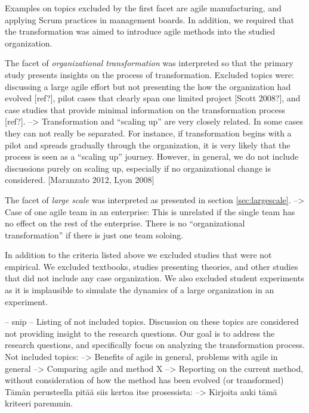 \documentclass[preprint,authoryear,12pt]{elsarticle}
\begin{document}
Examples on topics excluded by the first facet are agile manufacturing, and
applying Scrum practices in management boards. In addition, we required that the
transformation was aimed to introduce agile methods into the studied
organization.

The facet of \emph{organizational transformation} was interpreted so that the
primary study presents insights on the process of transformation. Excluded
topics were: discussing a large agile effort but not presenting the how the
organization had evolved [ref?], pilot cases that clearly span one limited
project [Scott 2008?], and case studies that provide minimal information on the
transformation process [ref?].
--> Transformation and ``scaling up'' are very closely related. In some cases
    they can not really be separated. For instance, if transformation begins
    with a pilot and spreads gradually through the organization, it is very
    likely that the process is seen as a ``scaling up'' journey.
    However, in general, we do not include discussions purely on scaling up,
    especially if no organizational change is considered. [Maranzato 2012, Lyon 2008]

The facet of \emph{large scale} was interpreted as presented in section
\ref{sec:largescale}.
--> Case of one agile team in an enterprise: This is unrelated if the single
    team has no effect on the rest of the enterprise. There is no
    ``organizational transformation'' if there is just one team soloing.  

In addition to the criteria listed above we excluded studies that were not
empirical. We excluded textbooks, studies presenting theories, and other studies
that did not include any case organization. We also excluded student experiments
as it is implausible to simulate the dynamics of a large organization in an
experiment.


% 

-- snip --
Listing of not included topics. Discussion on these topics are considered not
providing insight to the research questions. Our goal is to address the research
questions, and specifically focus on analyzing the transformation process.
Not included topics:
--> Benefits of agile in general, problems with agile in general
--> Comparing agile and method X
--> Reporting on the current method, without consideration of how the method has
    been evolved (or transformed)
Tämän perusteella pitää siis kertoa itse prosessista: --> Kirjoita auki tämä
kriteeri paremmin.
\end{document}

